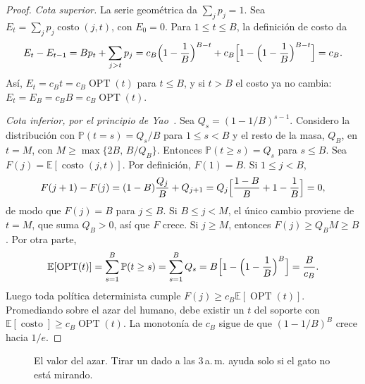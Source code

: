\documentclass[11pt,a4paper]{article}
\theoremstyle{plain}
\theoremstyle{definition}
\theoremstyle{remark}
\numberwithin{equation}{section}
\newcommand{\E}{\mathbb{E}}
\renewcommand{\P}{\mathbb{P}}
\newcommand{\costo}{\operatorname{costo}}
\newcommand{\OPT}{\operatorname{OPT}}
\begin{document}
\begin{proof}
\emph{Cota superior.} La serie geométrica da $\sum_j p_j=1$. Sea $E_t=\sum_j p_j\costo(j,t)$, con $E_0=0$. Para $1\le t\le B$, la definición de costo da
\begin{equation}
  E_t-E_{t-1}=Bp_t+\sum_{j>t}p_j=c_B\Bigl(1-\frac1B\Bigr)^{B-t}+c_B\Bigl[1-\Bigl(1-\frac1B\Bigr)^{B-t}\Bigr]=c_B .
\end{equation}
Así, $E_t=c_Bt=c_B\OPT(t)$ para $t\le B$, y si $t>B$ el costo ya no cambia: $E_t=E_B=c_BB=c_B\OPT(t)$.

\emph{Cota inferior, por el principio de Yao~\cite{yao}.} Sea $Q_s=(1-1/B)^{s-1}$. Considero la distribución con $\P(t=s)=Q_s/B$ para $1\le s<B$ y el resto de la masa, $Q_B$, en $t=M$, con $M\ge\max\{2B,\,B/Q_B\}$. Entonces $\P(t\ge s)=Q_s$ para $s\le B$. Sea $F(j)=\E[\costo(j,t)]$. Por definición, $F(1)=B$. Si $1\le j<B$,
\begin{equation}
  F(j+1)-F(j)=(1-B)\frac{Q_j}{B}+Q_{j+1}=Q_j\Bigl[\frac{1-B}{B}+1-\frac1B\Bigr]=0,
\end{equation}
de modo que $F(j)=B$ para $j\le B$. Si $B\le j<M$, el único cambio proviene de $t=M$, que suma $Q_B>0$, así que $F$ crece. Si $j\ge M$, entonces $F(j)\ge Q_BM\ge B$. Por otra parte,
\begin{equation}
  \E[\OPT(t)]=\sum_{s=1}^{B}\P(t\ge s)=\sum_{s=1}^{B}Q_s=B\Bigl[1-\Bigl(1-\frac1B\Bigr)^{B}\Bigr]=\frac{B}{c_B}.
\end{equation}
Luego toda política determinista cumple $F(j)\ge c_B\E[\OPT(t)]$. Promediando sobre el azar del humano, debe existir un $t$ del soporte con $\E[\costo]\ge c_B\OPT(t)$. La monotonía de $c_B$ sigue de que $(1-1/B)^B$ crece hacia $1/e$.
\end{proof}

\begin{figure}[ht]
\centering
{}
\caption{El valor del azar. Tirar un dado a las 3\,a.\,m. ayuda solo si el gato no está mirando.}\label{fig:noche}
\end{figure}
\end{document}
